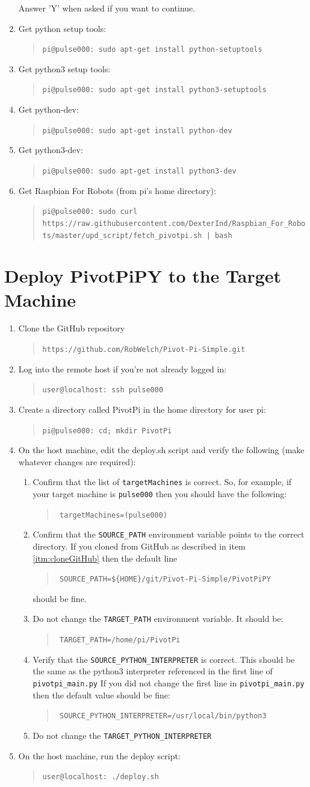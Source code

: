 \documentclass[11pt,oneside]{article}
\makeatletter
\newcommand{\localCommand}[1]{\begin{quote} \texttt{user@localhost: #1} \end{quote}}
\newcommand{\remoteCommandAfterRename}[1]{\begin{quote} \texttt{pi@pulse000: #1} \end{quote}}
\newcommand{\remoteCommandAfterRenameTiny}[1]{\begin{quote} \texttt{\tiny pi@pulse000: #1} \end{quote}}
\newcommand{\myurl}[1]{\begin{quote} \texttt{#1} \end{quote}}
\newcommand{\scriptline}[1]{\begin{quote}$\!\!\!\!\!\!\!\!\!\!\!\!\!$ \texttt{#1} \end{quote}}
\makeatother
\begin{document}
\begin{enumerate}
	Answer 'Y' when asked if you want to continue.
	\item Get python setup tools: \remoteCommandAfterRename{sudo apt-get install python-setuptools}
	\item Get python3 setup tools: \remoteCommandAfterRename{sudo apt-get install python3-setuptools}
	\item Get python-dev: \remoteCommandAfterRename{sudo apt-get install python-dev}
	\item Get python3-dev: \remoteCommandAfterRename{sudo apt-get install python3-dev}
	\item Get Raspbian For Robots (from pi's home directory):
	 \remoteCommandAfterRenameTiny{sudo curl https://raw.githubusercontent.com/DexterInd/Raspbian\_For\_Robots/master/upd\_script/fetch\_pivotpi.sh | bash}
\end{enumerate}

\section{Deploy PivotPiPY to the Target Machine}
\begin{enumerate}
	\item Clone the GitHub repository \myurl{https://github.com/RobWelch/Pivot-Pi-Simple.git} \label{itm:cloneGitHub}
	\item Log into the remote host if you're not already logged in: \localCommand{ssh pulse000}
	\item Create a directory called PivotPi in the home directory for user pi:  \remoteCommandAfterRename{cd; mkdir PivotPi}
	\item On the host machine, edit the deploy.sh script and verify the following (make whatever changes are required):
	\begin{enumerate}
		\item Confirm that the list of \texttt{targetMachines} is correct.  So, for example, if your target machine is \texttt{pulse000} then you should have the following:  \scriptline{targetMachines=(pulse000)}
		\item Confirm that the \texttt{SOURCE\_PATH} environment variable points to the correct directory.  If you cloned from GitHub as described in item \ref{itm:cloneGitHub} then the
		default line
		\scriptline{SOURCE\_PATH=\$\{HOME\}/git/Pivot-Pi-Simple/PivotPiPY}
		should be fine.
		\item Do not change the \texttt{TARGET\_PATH} environment variable.  It should be:
		\scriptline{TARGET\_PATH=/home/pi/PivotPi}
		\item Verify that the \texttt{SOURCE\_PYTHON\_INTERPRETER} is correct.  This should be the same as the python3 interpreter referenced in the first line of \texttt{pivotpi\_main.py}
		If you did not change the first line in \texttt{pivotpi\_main.py} then the default value should be fine:
		\scriptline{SOURCE\_PYTHON\_INTERPRETER=/usr/local/bin/python3}
		\item Do not change the \texttt{TARGET\_PYTHON\_INTERPRETER}
	\end{enumerate}
	\item On the host machine, run the deploy script: \localCommand{./deploy.sh}
\end{enumerate}
\end{document}
